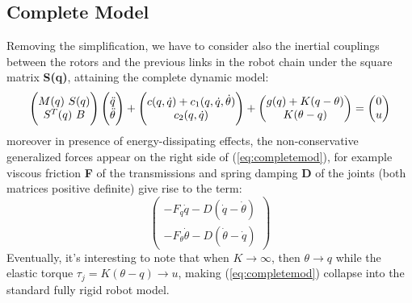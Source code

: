 \subsection{Complete Model}
Removing the simplification, we have to consider also the inertial couplings between the rotors and the previous links in the robot chain under the square matrix \textbf{S(q)}, attaining the complete dynamic model:
\begin{equation}\label{eq:completemod}
    \begin{pmatrix}M(q)~S(q)\\ S^T(q)~B\end{pmatrix}
    \begin{pmatrix}\Ddot{q}\\ \Ddot{\theta}\end{pmatrix} +
    \begin{pmatrix}c(q,\Dot{q})+c_1(q,\Dot{q},\Dot{\theta})\\ c_2(q,\Dot{q})\end{pmatrix} +
    \begin{pmatrix}g(q)+K(q-\theta)\\ K(\theta-q)\end{pmatrix} =
    \begin{pmatrix} 0 \\ u \end{pmatrix}
\end{equation}
moreover in presence of energy-dissipating effects, the non-conservative generalized forces appear on the right side of (\ref{eq:completemod}), for example viscous friction \textbf{F} of the transmissions and spring damping \textbf{D} of the joints \small{(both matrices positive definite)} give rise to the term:
\begin{equation}
    \begin{pmatrix} -F_q\Dot{q}-D(\Dot{q}-\Dot{\theta}) \\
    -F_\theta\Dot{\theta}-D(\Dot{\theta}-\Dot{q})
    \end{pmatrix}
\end{equation}
Eventually, it's interesting to note that when $K \rightarrow \infty $, then $\theta \rightarrow q $ while the elastic torque $\tau_j=K(\theta-q) \rightarrow u$, making (\ref{eq:completemod}) collapse into the standard fully rigid robot model.